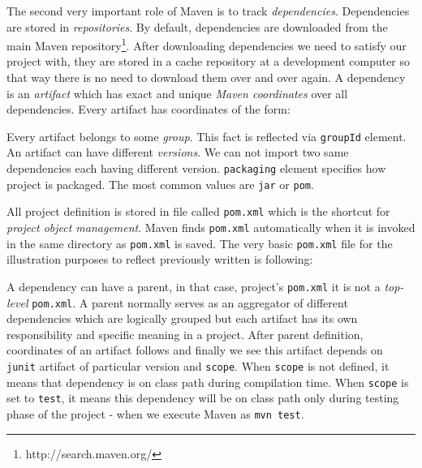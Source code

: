 \documentclass[12pt,final,oneside]{fithesis}
\begin{document}
The second very important role of Maven is to track \textit{dependencies}\cite{bib022}. Dependencies are stored in \textit{repositories}. By default, dependencies are downloaded from the main Maven repository\footnote{http://search.maven.org/}. After downloading dependencies we need to satisfy our project with, they are stored in a cache repository at a development computer so that way there is no need to download them over and over again. A dependency is an \textit{artifact} which has exact and unique \textit{Maven coordinates} over all dependencies. Every artifact has coordinates of the form:
\begin{center}
	\begin{minipage}{.7\textwidth}
		
	\end{minipage}
\end{center}
Every artifact belongs to some \textit{group}. This fact is reflected via \texttt{groupId} element. An artifact can have different \textit{versions}. We can not import two same dependencies each having different version. \texttt{packaging} element specifies how project is packaged. The most common values are \texttt{jar} or \texttt{pom}.

All project definition is stored in file called \texttt{pom.xml} which is the shortcut for \textit{project object management}. Maven finds \texttt{pom.xml} automatically when it is invoked in the same directory as \texttt{pom.xml} is saved. The very basic \texttt{pom.xml} file for the illustration purposes to reflect previously written is following:



A dependency can have a parent, in that case, project's \texttt{pom.xml} it is not a \textit{top-level} \texttt{pom.xml}. A parent normally serves as an aggregator of different dependencies which are logically grouped but each artifact has its own responsibility and specific meaning in a project. After parent definition, coordinates of an artifact follows and finally we see this artifact depends on \texttt{junit} artifact of particular version and \texttt{scope}. When \texttt{scope} is not defined, it means that dependency is on class path during compilation time. When \texttt{scope} is set to \texttt{test}, it means this dependency will be on class path only during testing phase of the project - when we execute Maven as \texttt{mvn test}.
\end{document}
